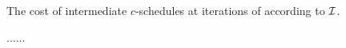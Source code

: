 \begin{figure}[htbp]
\caption{The cost of intermediate $c$-schedules at iterations of \algonameapx  according to $\mathcal{I}$.}\label{fig:conv}
\end{figure}


\begin{figure}[htbp]
	\caption{......} \label{fig:D100}
\end{figure}


